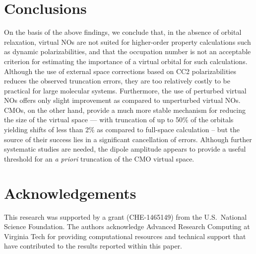 \section{Conclusions}

On the basis of the above findings, we conclude that, in the absence of
orbital relaxation, virtual NOs are not
suited for higher-order property calculations such as dynamic
polarizabilities, and that the occupation number is not an acceptable
criterion for estimating the importance of a virtual orbital for such
calculations.  Although the use of external space corrections based on CC2
polarizabilities reduces the observed truncation errors, they are too
relatively costly to be practical for large molecular systems.  Furthermore,
the use of perturbed virtual NOs offers only slight improvement as compared to
unperturbed virtual NOs.  CMOs, on the other hand, provide a much more stable
mechanism for reducing the size of the virtual space --- with truncation of up
to 50\% of the orbitals yielding shifts of less than 2\% as compared to
full-space calculation -- but the source of their success lies in a
significant cancellation of errors.  Although further systematic studies are
needed, the dipole amplitude appears to provide a useful threshold for an {\em
a priori} truncation of the CMO virtual space.

\section{Acknowledgements}

This research was supported by a grant (CHE-1465149) from the U.S.\
National Science Foundation. The authors acknowledge Advanced Research
Computing at Virginia Tech for providing computational resources and
technical support that have contributed to the results reported within this
paper.

\clearpage
%
%

\newpage

%

%
